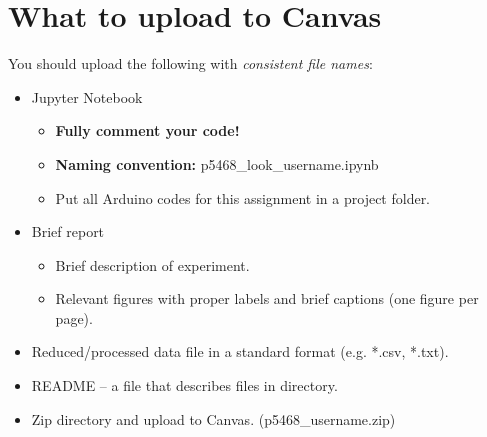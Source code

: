 \documentclass[10pt]{article}
\begin{document}
\section*{What to upload to Canvas}
You should upload the following with \textit{consistent file names}:

\begin{itemize}
	\item Jupyter Notebook
	\begin{itemize}
		\item \textbf{Fully comment your code!} 
		\item \textbf{Naming convention:} p5468\_look\_username.ipynb
		\item Put all Arduino codes for this assignment in a project folder. 
	\end{itemize}
	\item Brief report
	\begin{itemize}
		\item Brief description of experiment.
		\item Relevant figures with proper labels and brief captions (one figure per page).
	\end{itemize}
	\item Reduced/processed data file in a standard format (e.g. *.csv, *.txt). 
	\item README -- a file that describes files in directory. 
	\item Zip directory and upload to Canvas. (p5468\_username.zip)
\end{itemize}
\end{document}
